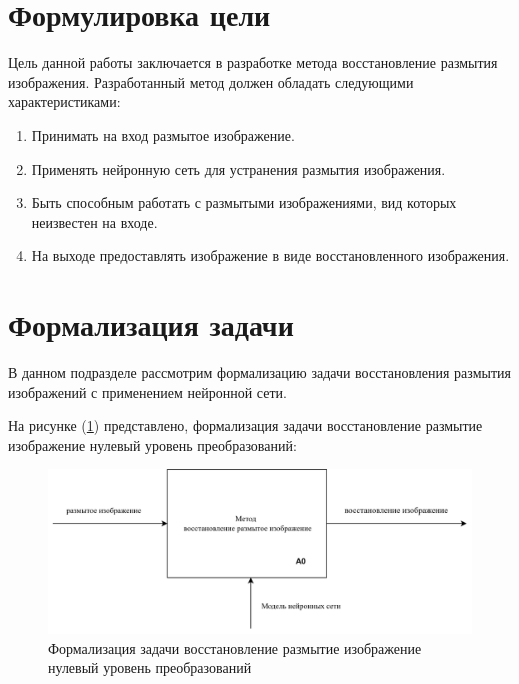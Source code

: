 \section{Формулировка цели}

Цель данной работы заключается в разработке метода восстановление размытия изображения. Разработанный метод должен обладать следующими характеристиками:

\begin{enumerate}
	\item Принимать на вход размытое изображение.
	\item Применять нейронную сеть для устранения размытия изображения.
	\item Быть способным работать с размытыми изображениями, вид которых неизвестен на входе.
	\item На выходе предоставлять изображение в виде восстановленного изображения.
\end{enumerate}

\section{Формализация задачи}

В данном подразделе рассмотрим формализацию задачи восстановления размытия изображений с применением нейронной сети.

На рисунке (\ref{fig:method-desc-a0}) представлено, формализация задачи восстановление размытие изображение нулевый уровень преобразований: 
\begin{figure}[H]
	\centering
	\includegraphics[width=1\linewidth]{assets/idef0-A0.png}
	\caption{Формализация задачи восстановление размытие изображение нулевый уровень преобразований}
	\label{fig:method-desc-a0}
\end{figure}


